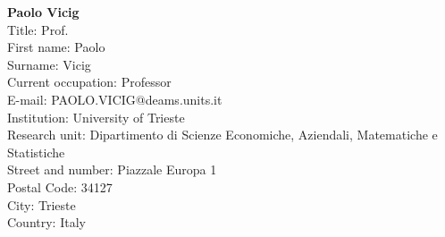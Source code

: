 \documentclass[11pt,dvipsnames,usenames,a4paper]{article}
\begin{document}
{\bf Paolo Vicig}\\
Title: Prof.\\
First name: Paolo\\
Surname:  Vicig \\
Current occupation: Professor\\
E-mail: PAOLO.VICIG@deams.units.it\\
Institution: University of Trieste\\
Research unit: Dipartimento di Scienze Economiche, Aziendali, Matematiche e Statistiche\\
Street and number: Piazzale Europa 1\\
Postal Code: 34127\\
City: Trieste\\
Country: Italy\\[-7pt]


\end{document}
